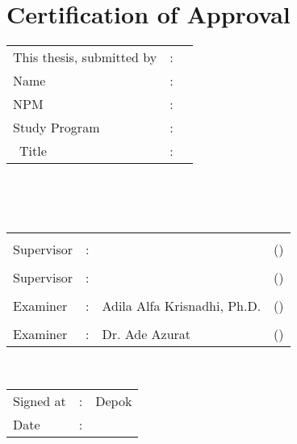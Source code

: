 %
%
%

\chapter*{Certification of Approval}

\vspace*{0.4cm}
\noindent 

\noindent
\begin{tabular}{ll p{9cm}}
	This thesis, submitted by&: & \\
	Name&: & \penulis \\
	NPM&: & \npm \\
	Study Program&: & \program \\
	\type~Title&: & \judul \\
\end{tabular} \\

\vspace*{1.0cm}

\noindent {}\\[0.2cm]

\begin{center}
\end{center}

\vspace*{0.3cm}

\begin{tabular}{l l l l }
	& & & \\
	Supervisor&: & \pembimbing & (\hspace*{3.0cm}) \\
	& & & \\
	Supervisor&: & \pembimbingDua & (\hspace*{3.0cm}) \\
	& & & \\
	Examiner&: & Adila Alfa Krisnadhi, Ph.D. & (\hspace*{3.0cm}) \\
	& & & \\
	Examiner&: & Dr. Ade Azurat & (\hspace*{3.0cm}) \\
\end{tabular}\\

\vspace*{2.0cm}

\begin{tabular}{ll l}
	Signed at&: & Depok\\
	Date&: & \tanggalLulus \\
\end{tabular}


\newpage